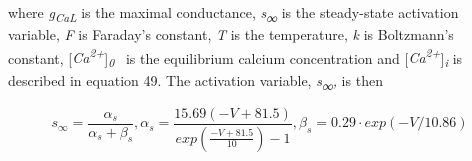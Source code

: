 \documentclass[12pt]{article}
\begin{document}
where \textit{g}\textit{\textsubscript{CaL}} is the maximal conductance, \textit{s}\textsf{\textit{\textsubscript{∞}}}
is the steady-state activation variable, \textit{F} is Faraday’s constant, \textit{T} is the temperature, \textit{k} is
Boltzmann’s constant, [\textit{Ca\textsuperscript{2+}}]\textit{\textsubscript{0}} \ is the
equilibrium calcium concentration and [\textit{Ca}\textit{\textsuperscript{2+}}]\textit{\textsubscript{i}} is
described in equation 49. The activation variable, \textit{s}\textsf{\textit{\textsubscript{∞}}}\textit{,} is then


\begin{equation}
s_{\infty }=\frac{\alpha_s}{\alpha_s+\beta_s} ,  \alpha_s=\frac{15.69(-V+81.5)}{exp(\frac{-V+81.5}{10})-1} ,  
\beta_s=0.29\cdot exp(-V/10.86)
\end{equation}
\end{document}
